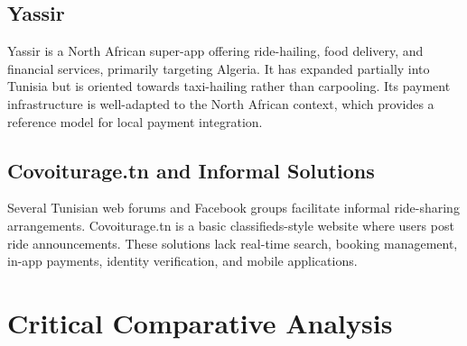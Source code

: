 \documentclass[12pt,a4paper,openright]{report}
\begin{document}
\subsection{Yassir}

Yassir \cite{yassir} is a North African super-app offering ride-hailing, food delivery, and financial services, primarily targeting Algeria. It has expanded partially into Tunisia but is oriented towards taxi-hailing rather than carpooling. Its payment infrastructure is well-adapted to the North African context, which provides a reference model for local payment integration.

\subsection{Covoiturage.tn and Informal Solutions}

Several Tunisian web forums and Facebook groups facilitate informal ride-sharing arrangements. Covoiturage.tn is a basic classifieds-style website where users post ride announcements. These solutions lack real-time search, booking management, in-app payments, identity verification, and mobile applications.

\section{Critical Comparative Analysis}
\end{document}
